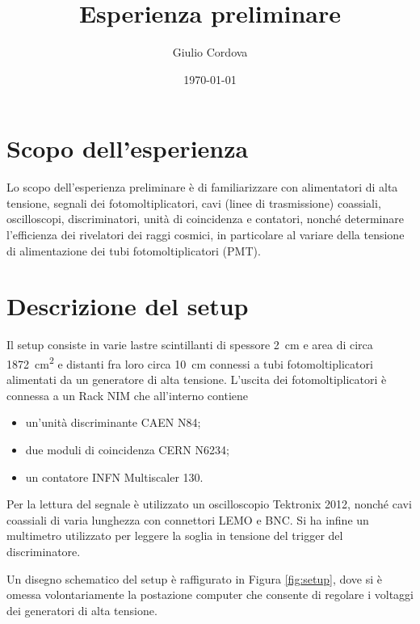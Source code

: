 \documentclass[10pt,a4paper]{article}
\author{Giulio Cordova}
\title{Esperienza preliminare}
\begin{document}
\twocolumn
\date{\today}
\maketitle

\section{Scopo dell'esperienza}

Lo scopo dell'esperienza preliminare è di familiarizzare con alimentatori di alta tensione, segnali dei fotomoltiplicatori, cavi (linee di trasmissione) coassiali, oscilloscopi, discriminatori, unità di coincidenza e contatori, nonché determinare l'efficienza dei rivelatori dei raggi cosmici, in particolare al variare della tensione di alimentazione dei tubi fotomoltiplicatori (PMT).

\section{Descrizione del setup}

Il setup consiste in varie lastre scintillanti di spessore \SI{2}{\centi\meter} e area di circa \SI{1872}{\centi\meter\squared} e distanti fra loro circa \SI{10}{\centi\meter} connessi a tubi fotomoltiplicatori alimentati da un generatore di alta tensione. L'uscita dei fotomoltiplicatori è connessa a un Rack NIM che all'interno contiene
\begin{itemize}
    \item un'unità discriminante CAEN N84;
    \item due moduli di coincidenza CERN N6234;
    \item un contatore INFN Multiscaler 130.
\end{itemize} 
Per la lettura del segnale è utilizzato un oscilloscopio Tektronix 2012, nonché cavi coassiali di varia lunghezza con connettori LEMO e BNC. Si ha infine un multimetro utilizzato per leggere la soglia in tensione del trigger del discriminatore.

Un disegno schematico del setup è raffigurato in Figura \ref{fig:setup}, dove si è omessa volontariamente la postazione computer che consente di regolare i voltaggi dei generatori di alta tensione.
\end{document}
